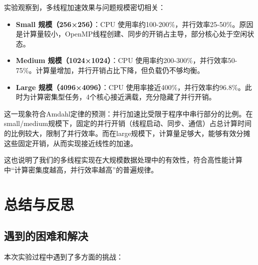 \documentclass[a4paper]{article}
\begin{document}
实验观察到，多线程加速效果与问题规模密切相关：

\begin{itemize}
    \item \textbf{Small 规模（256×256）}：CPU 使用率约100-200\%，并行效率25-50\%。原因是计算量较小，OpenMP线程创建、同步的开销占主导，部分核心处于空闲状态。
    \item \textbf{Medium 规模（1024×1024）}：CPU 使用率约200-300\%，并行效率50-75\%。计算量增加，并行开销占比下降，但负载仍不够均衡。
    \item \textbf{Large 规模（4096×4096）}：CPU 使用率接近400\%，并行效率约96.8\%。此时为计算密集型任务，4个核心接近满载，充分隐藏了并行开销。
\end{itemize}

这一现象符合Amdahl定律的预测：并行加速比受限于程序中串行部分的比例。在small/medium规模下，固定的并行开销（线程启动、同步、通信）占总计算时间的比例较大，限制了并行效率。而在large规模下，计算量足够大，能够有效分摊这些固定开销，从而实现接近线性的加速。

这也说明了我们的多线程实现在大规模数据处理中的有效性，符合高性能计算中“计算密集度越高，并行效率越高”的普遍规律。

\section{总结与反思}

\subsection{遇到的困难和解决}

本次实验过程中遇到了多方面的挑战：
\end{document}
